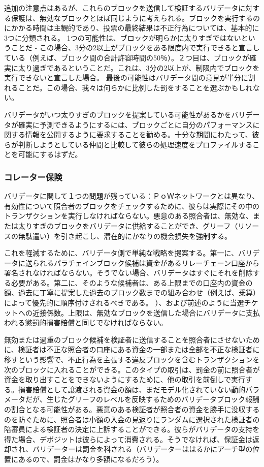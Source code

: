 追加の注意点はあるが、これらのブロックを送信して検証するバリデータに対する保護は、無効なブロックとほぼ同じように考えられる。ブロックを実行するのにかかる時間は主観的であり、投票の最終結果は不正行為については、基本的に3つに分類される。
1つの可能性は、ブロックが明らかに太りすぎではないということだ -
この場合、3分の2以上がブロックをある限度内で実行できると宣言している（例えば、ブロック間の合計許容時間の50％）。２つ目は、ブロックが確実に太り過ぎであるということだ。これは、3分の2以上が、制限内でブロックを実行できないと宣言した場合。
最後の可能性はバリデータ間の意見が半分に割れることだ。この場合、我々は何らかに比例した罰をすることを選ぶかもしれない。

バリデータがいつ太りすぎのブロックを提案している可能性があるかをバリデータが確実に予測できるようにするには、ブロックごとに自分のパフォーマンスに関する情報を公開するように要求することを勧める。十分な期間にわたって、彼らが判断しようとしている仲間と比較して彼らの処理速度をプロファイルすることを可能にするはずだ。

\hypertarget{ux30b3ux30ecux30fcux30bfux30fcux4fddux967a}{%
\subsubsection{コレーター保険}\label{ux30b3ux30ecux30fcux30bfux30fcux4fddux967a}}

バリデータに関して１つの問題が残っている：ＰｏＷネットワークとは異なり、有効性について照合者のブロックをチェックするために、彼らは実際にその中のトランザクションを実行しなければならない。悪意のある照合者は、無効な、または太りすぎのブロックをバリデータに供給することができ、グリーフ（リソースの無駄遣い）を引き起こし、潜在的にかなりの機会損失を強制する。

これを軽減するために、バリデータ側で単純な戦略を提案する。第一に、バリデータに送られるパラチェインブロック候補は資金があるリレーチェーン口座から署名されなければならない。そうでない場合、バリデータはすぐにそれを削除する必要がある。第二に、そのような候補者は、ある上限までの口座内の資金の額、過去に丁寧に提案した過去のブロック数までの組み合わせ（例えば、乗算）によって優先的に順序付けされるべきである。
）、および前述のように当選チケットへの近接係数。上限は、無効なブロックを送信した場合にバリデータに支払われる懲罰的損害賠償と同じでなければならない。

無効または過重のブロック候補を検証者に送信することを照合者にさせないために、検証者は不正な照合者の口座にある資金の一部または全部を不正な検証者に移すという影響で、不正行為を主張する違反ブロックを含むトランザクションを次のブロックに入れることができる。このタイプの取引は、罰金の前に照合者が資金を取り出すことをできないようにするために、他の取引を前倒しで実行する。損害賠償として譲渡される資金の額は、まだモデル化されていない動的パラメータだが、生じたグリーフのレベルを反映するためのバリデータブロック報酬の割合となる可能性がある。悪意のある検証者が照合者の資金を勝手に没収するのを防ぐために、照合者は小額の入金の見返りにランダムに選択された検証者の陪審員による検証者の決定に上訴することができる。彼らがバリデータの支持を得た場合、デポジットは彼らによって消費される。そうでなければ、保証金は返却され、バリデーターは罰金を科される（バリデーターははるかにアーチ型の位置にあるので、罰金はかなり多額になるだろう）。

